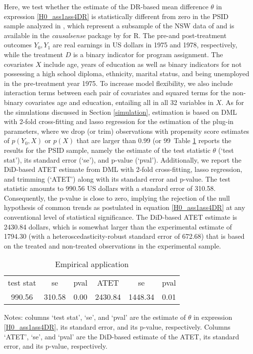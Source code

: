 {Here, we test whether the estimate of the DR-based mean difference \(\theta\) in expression \eqref{H0_ass1ass4DR} is statistically different from zero in the PSID sample analyzed in \cite{DehejiaWahba99}, which represent a subsample of the NSW data of \cite{LaLonde86}  and is available in the \textit{causalsense} package by \cite{causalsens} for \textsf{R}.
The pre-and post-treatment outcomes \(Y_0, Y_1\) are real earnings in US dollars in 1975 and 1978, respectively, while the treatment \(D\) is a binary indicator for program assignment. The covariates \(X\) include age, years of education as well as binary indicators for not possessing a high school diploma, ethnicity, marital status, and being unemployed in the pre-treatment year 1975. To increase model flexibility, we also include interaction terms between each pair of covariates and squared terms for the non-binary covariates age and education, entailing all in all 32 variables in \(X\). As for the simulations discussed in Section \ref{simulation}, estimation is based on DML with 2-fold cross-fitting and lasso regression for the estimation of the plug-in parameters, where we drop (or trim) observations with propensity score estimates of \(p(Y_0,X)\) or \(p(X)\) that are larger than 0.99 (or 99\
Table \ref{tab:app} reports the results for the PSID sample, namely the estimate of the test statistic \(\theta\) (`test stat'), its standard error (`se'), and p-value (`pval'). Additionally, we report the DiD-based ATET estimate from DML with 2-fold cross-fitting, lasso regression, and trimming (`ATET') along with its standard error and p-value. The test statistic amounts to 990.56 US dollars with a standard error of 310.58.  Consequently, the p-value is close to zero, implying the rejection of the null hypothesis of common trends as postulated in equation \eqref{H0_ass1ass4DR} at any conventional level of statistical significance. The DiD-based ATET estimate is 2430.84 dollars, which is somewhat larger than the experimental estimate of 1794.30 (with a heteroscedasticity-robust standard error of 672.68) that is based on the treated and non-treated observations in the experimental sample. 



   	
		\begin{table}[htbp]
		\begin{center}
			\caption{Empirical application}
			\label{tab:app}
			\begin{tabular}{ccc|ccc}
				\hline\hline
				 test stat & se & pval & ATET & se & pval  \\
				 990.56 & 310.58 &  0.00 &  2430.84 & 1448.34 &  0.01 \\ 
				 \hline
			\end{tabular}
		\end{center}
		\par
		{\scriptsize Notes: columns `test stat', `se', and `pval' are the estimate of $\theta$ in expression \eqref{H0_ass1ass4DR}, its standard error, and its p-value, respectively. Columns  `ATET', `se', and `pval' are the DiD-based estimate of the ATET, its standard error, and its p-value, respectively.}
	\end{table}

}
